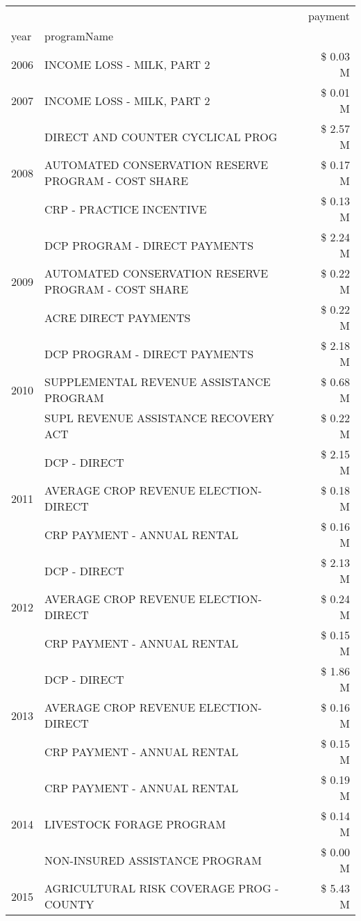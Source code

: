 \begin{tabular}{llr}
\toprule
 &  & payment \\
year & programName &  \\
\midrule
2006 & INCOME LOSS - MILK, PART 2 & \$ 0.03 M \\
\cline{1-3}
2007 & INCOME LOSS - MILK, PART 2 & \$ 0.01 M \\
\cline{1-3}
\multirow[t]{3}{*}{2008} & DIRECT AND COUNTER CYCLICAL PROG & \$ 2.57 M \\
 & AUTOMATED CONSERVATION RESERVE PROGRAM - COST SHARE & \$ 0.17 M \\
 & CRP - PRACTICE INCENTIVE & \$ 0.13 M \\
\cline{1-3}
\multirow[t]{3}{*}{2009} & DCP PROGRAM - DIRECT PAYMENTS & \$ 2.24 M \\
 & AUTOMATED CONSERVATION RESERVE PROGRAM - COST SHARE & \$ 0.22 M \\
 & ACRE DIRECT PAYMENTS & \$ 0.22 M \\
\cline{1-3}
\multirow[t]{3}{*}{2010} & DCP PROGRAM - DIRECT PAYMENTS & \$ 2.18 M \\
 & SUPPLEMENTAL REVENUE ASSISTANCE PROGRAM & \$ 0.68 M \\
 & SUPL REVENUE ASSISTANCE RECOVERY ACT & \$ 0.22 M \\
\cline{1-3}
\multirow[t]{3}{*}{2011} & DCP - DIRECT & \$ 2.15 M \\
 & AVERAGE CROP REVENUE ELECTION-DIRECT & \$ 0.18 M \\
 & CRP PAYMENT - ANNUAL RENTAL & \$ 0.16 M \\
\cline{1-3}
\multirow[t]{3}{*}{2012} & DCP - DIRECT & \$ 2.13 M \\
 & AVERAGE CROP REVENUE ELECTION-DIRECT & \$ 0.24 M \\
 & CRP PAYMENT - ANNUAL RENTAL & \$ 0.15 M \\
\cline{1-3}
\multirow[t]{3}{*}{2013} & DCP - DIRECT & \$ 1.86 M \\
 & AVERAGE CROP REVENUE ELECTION-DIRECT & \$ 0.16 M \\
 & CRP PAYMENT - ANNUAL RENTAL & \$ 0.15 M \\
\cline{1-3}
\multirow[t]{3}{*}{2014} & CRP PAYMENT - ANNUAL RENTAL & \$ 0.19 M \\
 & LIVESTOCK FORAGE PROGRAM & \$ 0.14 M \\
 & NON-INSURED ASSISTANCE PROGRAM & \$ 0.00 M \\
\cline{1-3}
\multirow[t]{3}{*}{2015} & AGRICULTURAL RISK COVERAGE PROG - COUNTY & \$ 5.43 M \\

\end{tabular}
